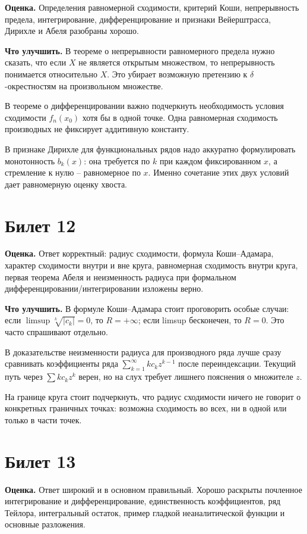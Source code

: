 \documentclass[12pt,a4paper]{article}
\begin{document}
\textbf{Оценка.} Определения равномерной сходимости, критерий Коши,
непрерывность предела, интегрирование, дифференцирование и признаки
Вейерштрасса, Дирихле и Абеля разобраны хорошо.

\textbf{Что улучшить.}
В теореме о непрерывности равномерного предела нужно сказать, что если
\(X\) не является открытым множеством, то непрерывность понимается
относительно \(X\). Это убирает возможную претензию к \(\delta\)-окрестностям
на произвольном множестве.

В теореме о дифференцировании важно подчеркнуть необходимость условия
сходимости \(f_n(x_0)\) хотя бы в одной точке. Одна равномерная сходимость
производных не фиксирует аддитивную константу.

В признаке Дирихле для функциональных рядов надо аккуратно формулировать
монотонность \(b_k(x)\): она требуется по \(k\) при каждом фиксированном
\(x\), а стремление к нулю -- равномерное по \(x\). Именно сочетание этих
двух условий дает равномерную оценку хвоста.

\section*{Билет 12}

\textbf{Оценка.} Ответ корректный: радиус сходимости, формула
Коши--Адамара, характер сходимости внутри и вне круга, равномерная
сходимость внутри круга, первая теорема Абеля и неизменность радиуса при
формальном дифференцировании/интегрировании изложены верно.

\textbf{Что улучшить.}
В формуле Коши--Адамара стоит проговорить особые случаи:
если \(\limsup\sqrt[k]{|c_k|}=0\), то \(R=+\infty\); если limsup бесконечен,
то \(R=0\). Это часто спрашивают отдельно.

В доказательстве неизменности радиуса для производного ряда лучше сразу
сравнивать коэффициенты ряда \(\sum_{k=1}^\infty kc_k z^{k-1}\) после
переиндексации. Текущий путь через \(\sum kc_k z^k\) верен, но на слух
требует лишнего пояснения о множителе \(z\).

На границе круга стоит подчеркнуть, что радиус сходимости ничего не говорит
о конкретных граничных точках: возможна сходимость во всех, ни в одной или
только в части точек.

\section*{Билет 13}

\textbf{Оценка.} Ответ широкий и в основном правильный. Хорошо раскрыты
почленное интегрирование и дифференцирование, единственность коэффициентов,
ряд Тейлора, интегральный остаток, пример гладкой неаналитической функции и
основные разложения.
\end{document}
